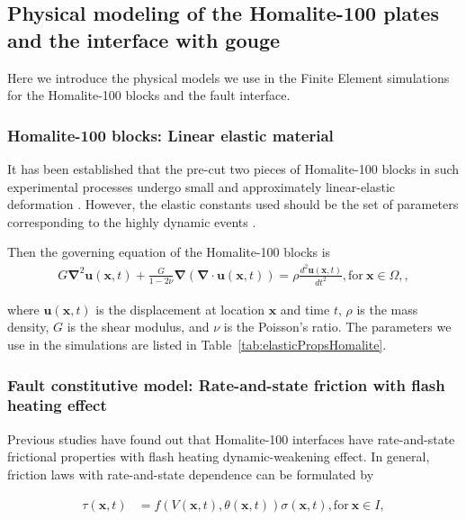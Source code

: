 \documentclass[final,a4paper]{elsarticle}
\begin{document}
\FloatBarrier
\subsection{Physical modeling of the Homalite-100 plates and the interface with gouge}
Here we introduce the physical models we use in the Finite Element simulations for the Homalite-100 blocks and the fault interface. 

\subsubsection{Homalite-100 blocks: Linear elastic material}
It has been established that the pre-cut two pieces of Homalite-100 blocks in such experimental processes undergo small and approximately linear-elastic deformation \cite{rubino_understanding_2017}. 
However, 
the elastic constants used should be the set of parameters corresponding to the highly dynamic events \cite{rubino_understanding_2017}.

Then the governing equation of the Homalite-100 blocks is
\begin{align}
    G \boldsymbol{\nabla}^2 \boldsymbol{u}(\boldsymbol{x}, t) + \frac{G}{1 - 2\nu} \boldsymbol{\nabla} (\boldsymbol{\nabla} \cdot \boldsymbol{u}(\boldsymbol{x}, t)) = \rho \frac{d^2 \boldsymbol{u}(\boldsymbol{x}, t)}{d t^2}, \text{for}\ \boldsymbol{x} \in \Omega, \label{eq:Homalite},
\end{align}

\noindent where $\boldsymbol{u}(\boldsymbol{x}, t)$ is the displacement at location $\boldsymbol{x}$ and time $t$, 
$\rho$ is the mass density, 
$G$ is the shear modulus, 
and $\nu$ is the Poisson's ratio. 
The parameters we use in the simulations are listed in Table~\ref{tab:elasticPropsHomalite}.

\subsubsection{Fault constitutive model: Rate-and-state friction with flash heating effect}
Previous studies have found out that Homalite-100 interfaces have rate-and-state frictional properties with flash heating dynamic-weakening effect. 
In general, 
friction laws with rate-and-state dependence can be formulated by 

\begin{align}
    \tau(\boldsymbol{x}, t) &= f\left(V(\boldsymbol{x}, t), \theta(\boldsymbol{x}, t)\right) \sigma(\boldsymbol{x}, t), \text{for}\ \boldsymbol{x} \in I, \label{eq:generalFric} 
\end{align}
\end{document}
